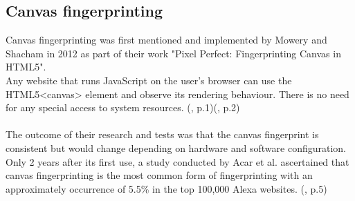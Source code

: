 \subsection{Canvas fingerprinting}
Canvas fingerprinting was first mentioned and implemented by Mowery and Shacham in 2012 as part of their work "Pixel Perfect: Fingerprinting Canvas in HTML5".\\ Any website that runs JavaScript on the user's browser can use the HTML5<canvas> element and observe its rendering behaviour. There is no need for any special access to system resources. (\textcite{mowery12}, p.1)(\textcite{upi15}, p.2)\\\\
The outcome of their research and tests was that the canvas fingerprint is consistent but would change depending on hardware and software configuration. Only 2 years after its first use, a study conducted by Acar et al. ascertained that canvas fingerprinting is the most common form of fingerprinting with an approximately occurrence of 5.5\% in the top 100,000 Alexa websites. (\textcite{acar14}, p.5)

